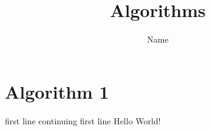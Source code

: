 \documentclass{article}
\title{Algorithms}
\author{Name}
\date{}
\begin{document}
\maketitle
\section{Algorithm 1}

\begin{algorithmic}[1]
	\State first line
	\Statex continuing first line
	\State {}
	\State \Output Hello World!
\end{algorithmic}
\end{document}

